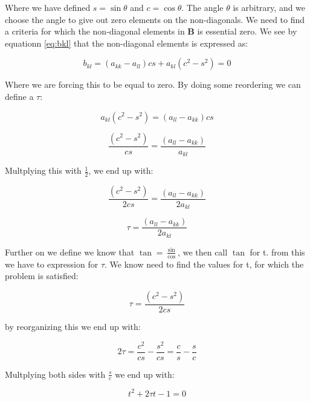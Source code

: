 \documentclass[twoside,onecolumn]{article}
\begin{document}
\bigskip 

Where we have defined $s = \sin\theta$ and $c = \cos\theta$. The angle $\theta$ is arbitrary, and we choose the angle to give out zero elements on the non-diagonals. We need to find a criteria for which the non-diagonal elements in $\mathbf{B}$ is essential zero. We see by equationn \ref{eq:bkl} that the non-diagonal elements is expressed as: 

\begin{equation*}
b_{kl} = (a_{kk} - a_{ll})cs + a_{kl}(c^2-s^2) = 0
\end{equation*}

Where we are forcing this to be equal to zero. By doing some reordering we can define a $\tau$: 

\begin{equation*}
 a_{kl}(c^2-s^2) = (a_{ll}-a_{kk})cs
\end{equation*}


\begin{equation*}
\frac{(c^2-s^2)}{cs} = \frac{(a_{ll}-a_{kk})}{a_{kl}}   
\end{equation*}

Multplying this with $\frac{1}{2}$, we end up with: 

\begin{equation*}
\frac{(c^2-s^2)}{2cs} = \frac{(a_{ll}-a_{kk})}{2a_{kl}}   
\end{equation*}

\begin{equation}
\tau = \frac{(a_{ll}-a_{kk})}{2a_{kl}}   
\end{equation}


Further on we define we know that $\tan = \frac{\sin}{\cos}$, we then call $\tan$ for t. from this we have to expression for $\tau$. We know need to find the values for t, for which the problem is satisfied: 

\begin{equation*}
\tau = \frac{(c^2-s^2)}{2cs} 
\end{equation*}

by reorganizing this we end up with: 

\begin{equation*}
2\tau = \frac{c^2}{cs}-\frac{s^2}{cs} = \frac{c}{s}-\frac{s}{c}
\end{equation*}

Multplying both sides with $\frac{s}{c}$ we end up with: 

\begin{equation*}
t^2 + 2\tau t - 1 = 0 
\end{equation*}
\end{document}
